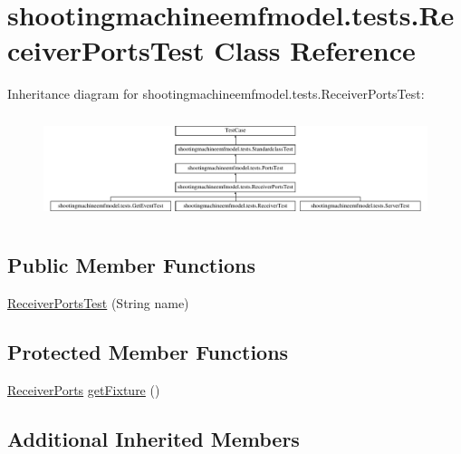 \hypertarget{classshootingmachineemfmodel_1_1tests_1_1_receiver_ports_test}{\section{shootingmachineemfmodel.\-tests.\-Receiver\-Ports\-Test Class Reference}
\label{classshootingmachineemfmodel_1_1tests_1_1_receiver_ports_test}
}
Inheritance diagram for shootingmachineemfmodel.\-tests.\-Receiver\-Ports\-Test\-:\begin{figure}[H]
\begin{center}
\leavevmode
\includegraphics[height=3.080308cm]{classshootingmachineemfmodel_1_1tests_1_1_receiver_ports_test}
\end{center}
\end{figure}
\subsection*{Public Member Functions}
\begin{DoxyCompactItemize}
\item 
\hyperlink{classshootingmachineemfmodel_1_1tests_1_1_receiver_ports_test_a873c5ac8578d210ae7f9d1db12ab44cd}{Receiver\-Ports\-Test} (String name)
\end{DoxyCompactItemize}
\subsection*{Protected Member Functions}
\begin{DoxyCompactItemize}
\item 
\hyperlink{interfaceshootingmachineemfmodel_1_1_receiver_ports}{Receiver\-Ports} \hyperlink{classshootingmachineemfmodel_1_1tests_1_1_receiver_ports_test_a8ecb855bbfbcf750ef2e1f1a99fd4251}{get\-Fixture} ()
\end{DoxyCompactItemize}
\subsection*{Additional Inherited Members}


